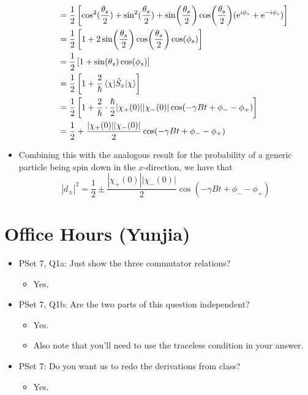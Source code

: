 \documentclass[../notes.tex]{subfiles}
\begin{document}
\begin{itemize}
\begin{itemize}
\begin{align*}
            &= \frac{1}{2}\left[ \cos^2(\frac{\theta_s}{2})+\sin^2(\frac{\theta_s}{2})+\sin(\frac{\theta_s}{2})\cos(\frac{\theta_s}{2})(\e[i\phi_s]+\e[-i\phi_s]) \right]\\
            &= \frac{1}{2}\left[ 1+2\sin(\frac{\theta_s}{2})\cos(\frac{\theta_s}{2})\cos(\phi_s) \right]\\
            &= \frac{1}{2}\left[ 1+\sin(\theta_s)\cos(\phi_s) \right]\\
            &= \frac{1}{2}\left[ 1+\frac{2}{\hbar}\ev{\hat{S}_x}{\chi} \right]\\
            &= \frac{1}{2}\left[ 1+\frac{2}{\hbar}\cdot\frac{\hbar}{2}|\chi_+(0)||\chi_-(0)|\cos(-\gamma Bt+\phi_--\phi_+) \right]\\
            &= \frac{1}{2}+\frac{|\chi_+(0)||\chi_-(0)|}{2}\cos(-\gamma Bt+\phi_--\phi_+)
        \end{align*}
    \end{itemize}
    \item Combining this with the analogous result for the probability of a generic particle being spin down in the $x$-direction, we have that
    \begin{equation*}
        |d_\pm|^2 = \frac{1}{2}\pm\frac{|\chi_+(0)||\chi_-(0)|}{2}\cos(-\gamma Bt+\phi_--\phi_+)
    \end{equation*}
\end{itemize}



\section{Office Hours (Yunjia)}
\begin{itemize}
    \item {}PSet 7, Q1a: Just show the three commutator relations?
    \begin{itemize}
        \item Yes.
    \end{itemize}
    \item PSet 7, Q1b: Are the two parts of this question independent?
    \begin{itemize}
        \item Yes.
        \item Also note that you'll need to use the traceless condition in your answer.
    \end{itemize}
    \item PSet 7: Do you want us to redo the derivations from class?
    \begin{itemize}
        \item Yes.
    \end{itemize}
\end{itemize}
\end{document}
